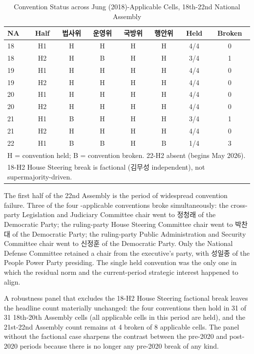 \documentclass[11pt]{article}
\begin{document}
\begin{table}[ht]
\centering
\caption{Convention Status across Jung (2018)-Applicable Cells, 18th-22nd National Assembly}
\label{tab:conv}
\begin{tabular}{lccccccc}
\toprule
NA & Half & 법사위 & 운영위 & 국방위 & 행안위 & Held & Broken \\
\midrule
18 & H1 & H & H & H & H & 4/4 & 0 \\
18 & H2 & H & B & H & H & 3/4 & 1 \\
19 & H1 & H & H & H & H & 4/4 & 0 \\
19 & H2 & H & H & H & H & 4/4 & 0 \\
20 & H1 & H & H & H & H & 4/4 & 0 \\
20 & H2 & H & H & H & H & 4/4 & 0 \\
21 & H1 & B & H & H & H & 3/4 & 1 \\
21 & H2 & H & H & H & H & 4/4 & 0 \\
22 & H1 & B & B & H & B & 1/4 & 3 \\
\bottomrule
\multicolumn{8}{l}{\footnotesize H = convention held; B = convention broken. 22-H2 absent (begins May 2026).} \\
\multicolumn{8}{l}{\footnotesize 18-H2 House Steering break is factional (김무성 independent), not supermajority-driven.} \\
\end{tabular}
\end{table}

The first half of the 22nd Assembly is the period of widespread convention failure. Three of the four \citet{jung2018}-applicable conventions broke simultaneously: the cross-party Legislation and Judiciary Committee chair went to 정청래 of the Democratic Party; the ruling-party House Steering Committee chair went to 박찬대 of the Democratic Party; the ruling-party Public Administration and Security Committee chair went to 신정훈 of the Democratic Party. Only the National Defense Committee retained a chair from the executive's party, with 성일종 of the People Power Party presiding. The single held convention was the only one in which the residual norm and the current-period strategic interest happened to align.

A robustness panel that excludes the 18-H2 House Steering factional break leaves the headline count materially unchanged: the four conventions then hold in 31 of 31 18th-20th Assembly cells (all applicable cells in this period are held), and the 21st-22nd Assembly count remains at 4 broken of 8 applicable cells. The panel without the factional case sharpens the contrast between the pre-2020 and post-2020 periods because there is no longer any pre-2020 break of any kind.
\end{document}
